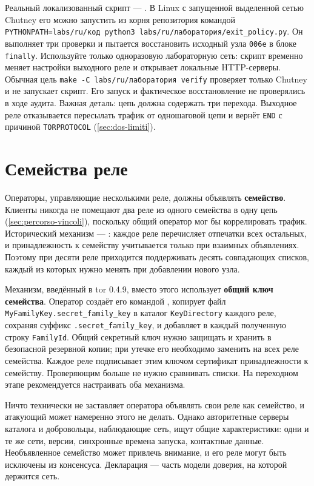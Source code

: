 Реальный локализованный скрипт — . В Linux с запущенной выделенной сетью Chutney его можно запустить из корня репозитория командой \texttt{PYTHONPATH=labs/ru/код python3 labs/ru/лаборатория/exit\_policy.py}. Он выполняет три проверки и пытается восстановить исходный  узла \texttt{006e} в блоке \texttt{finally}. Используйте только одноразовую лабораторную сеть: скрипт временно меняет настройки выходного реле и открывает локальные HTTP-серверы. Обычная цель \texttt{make -C labs/ru/лаборатория verify} проверяет только Chutney и не запускает скрипт. Его запуск и фактическое восстановление не проверялись в ходе аудита. Важная деталь: цепь должна содержать три перехода. Выходное реле отказывается пересылать трафик от одношаговой цепи и вернёт \texttt{END} с причиной \texttt{TORPROTOCOL} (\cref{sec:dos-limiti}).

\section{Семейства реле}\label{sec:relay-famiglie}

Операторы, управляющие несколькими реле, должны объявлять \textbf{семейство}. Клиенты никогда не помещают два реле из одного семейства в одну цепь (\cref{sec:percorso-vincoli}), поскольку общий оператор мог бы коррелировать трафик. Исторический механизм — : каждое реле перечисляет отпечатки всех остальных, и принадлежность к семейству учитывается только при взаимных объявлениях. Поэтому при десяти реле приходится поддерживать десять совпадающих списков, каждый из которых нужно менять при добавлении нового узла.

Механизм, введённый в tor 0.4.9, вместо этого использует \textbf{общий ключ семейства}. Оператор создаёт его командой , копирует файл \texttt{MyFamilyKey.secret\_family\_key} в каталог \texttt{KeyDirectory} каждого реле, сохраняя суффикс \texttt{.secret\_family\_key}, и добавляет в каждый  полученную строку \texttt{FamilyId}. Общий секретный ключ нужно защищать и хранить в безопасной резервной копии; при утечке его необходимо заменить на всех реле семейства. Каждое реле подписывает этим ключом сертификат принадлежности к семейству. Проверяющим больше не нужно сравнивать списки. На переходном этапе рекомендуется настраивать оба механизма.

\begin{approfondimento}
Ничто технически не заставляет оператора объявлять свои реле как семейство, и атакующий может намеренно этого не делать. Однако авторитетные серверы каталога и добровольцы, наблюдающие сеть, ищут общие характеристики: одни и те же сети, версии, синхронные времена запуска, контактные данные. Необъявленное семейство может привлечь внимание, и его реле могут быть исключены из консенсуса. Декларация — часть модели доверия, на которой держится сеть.
\end{approfondimento}


